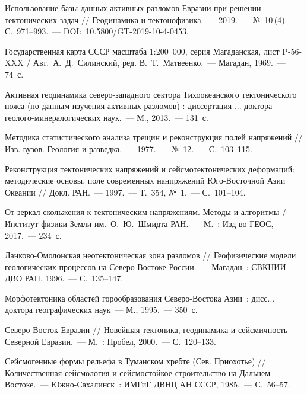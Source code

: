 \begin{thebibliography}{99}
\bibitem{} Использование базы данных активных разломов Евразии при решении тектонических задач // Геодинамика и тектонофизика.~--- 2019.~--- №~10\,(4).~--- С.~971--993.~--- DOI:~10.5800/GT-2019-10-4-0453.

\bibitem{}Государственная карта СССР масштаба 1:200 000, серия Магаданская, лист P-56-XXX / Авт.~А.~Д.~Силинский, ред. В.~Т.~Матвеенко.~--- Магадан, 1969.~--- 74~с.

\bibitem{} Активная геодинамика северо-западного сектора Тихоокеанского тектонического пояса (по данным изучения активных разломов) : диссертация ... доктора геолого-минералогических наук.~--- М., 2013.~--- 131~с.

\bibitem{} Методика статистического анализа трещин и реконструкция полей напряжений // Изв. вузов. Геология и разведка.~--- 1977.~--- №~12.~--- С.~103--115.

\bibitem{} Реконструкция тектонических напряжений и сейсмотектонических деформаций: методические основы, поле современных нанпряжений Юго-Восточной Азии Океании // Докл. РАН.~--- 1997.~--- Т.~354, №~1.~--- С.~101--104.

\bibitem{} От зеркал скольжения к тектоническим напряжениям. Методы и алгоритмы / Институт физики Земли им.~О.~Ю.~Шмидта РАН.~--- М.~: Изд-во ГЕОС, 2017.~--- 234~с.

\bibitem{} Ланково-Омолонская неотектоническая зона разломов // Геофизические модели геологических процессов на Северо-Востоке России.~--- Магадан~: СВКНИИ ДВО РАН, 1996.~--- С.~135--147.

\bibitem{} Морфотектоника областей горообразования Северо-Востока Азии~: дисс... доктора географических наук~--- М., 1995.~--- 350~с.

\bibitem{} Северо-Восток Евразии // Новейшая тектоника, геодинамика и сейсмичность Северной Евразии.~--- М.~: Пробел, 2000.~--- С.~120--133.

\bibitem{} Сейсмогенные формы рельефа в Туманском хребте (Сев. Приохотье) // Количественная сейсмология  и  сейсмостойкое  строительство  на  Дальнем  Востоке.~--- Южно-Сахалинск~: ИМГиГ ДВНЦ АН СССР, 1985.~--- С.~56--57.
\end{thebibliography}
